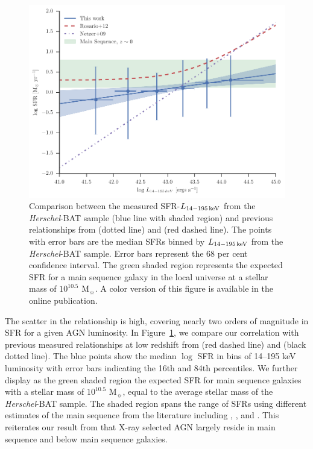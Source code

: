 \documentclass[fleqn, usenatbib]{mnras}
\newcommand{\herschel}{\emph{Herschel}}
\newcommand{\msun}{M$_{\sun}$}
\begin{document}

\begin{figure}
\includegraphics{figures/lbat_sfr_correlation_compare_lit_with_MS}
\caption{Comparison between the measured SFR-$L_{\rm 14-195\,keV}$ from the \herschel-BAT sample (blue line with shaded region) and previous relationships from \citet{Netzer:2009lr} (dotted line) and \citet{Rosario:2012fr} (red dashed line). The points with error bars are the median SFRs binned by $L_{\rm 14-195\,keV}$ from the \herschel-BAT sample. Error bars represent the 68 per cent confidence interval.  The green shaded region represents the expected SFR for a main sequence galaxy in the local universe at a stellar mass of $10^{10.5}$ \msun. A color version of this figure is available in the online publication.\label{fig:sfr_lbat_correlation_lit}}
\end{figure}

The scatter in the relationship is high, covering nearly two orders of magnitude in SFR for a given AGN luminosity. In Figure~\ref{fig:sfr_lbat_correlation_lit}, we compare our correlation with previous measured relationships at low redshift from \citet{Rosario:2012fr} (red dashed line) and \citet{Netzer:2009lr} (black dotted line). The blue points show the median $\log$ SFR in bins of 14--195 keV luminosity with error bars indicating the 16th and 84th percentiles. We further display as the green shaded region the expected SFR for main sequence galaxies with a stellar mass of $10^{10.5}$ \msun, equal to the average stellar mass of the \herschel-BAT sample. The shaded region spans the range of SFRs using different estimates of the main sequence from the literature including \citet{Shimizu:2015xo}, \citet{Schreiber:2015eu}, and \citet{Speagle:2014rc}. This reiterates our result from \citet{Shimizu:2015xo} that X-ray selected AGN largely reside in main sequence and below main sequence galaxies. 
\end{document}
